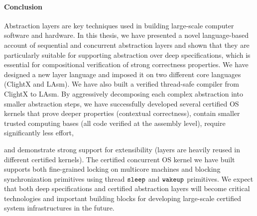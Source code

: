 
\paragraph{Conclusion}
Abstraction layers are key techniques used in building large-scale
computer software and hardware. In this thesis, we have presented a
novel language-based account of sequential and concurrent abstraction layers and shown that they
are particularly suitable for supporting abstraction over deep
specifications, which is essential for compositional verification of
strong correctness properties. We have designed a new layer language
and imposed it on two different core languages (ClightX and LAsm). We
have also built a verified thread-safe compiler from ClightX to LAsm. By
aggressively decomposing each complex abstraction into smaller
abstraction steps, we have successfully developed several certified OS
kernels that prove deeper properties (contextual correctness), contain
smaller trusted computing bases (all code verified at the assembly
level), require significantly less effort, 
and demonstrate
strong support for extensibility (layers are heavily reused in
different certified kernels).  The
certified concurrent OS kernel we have built supports both fine-grained locking
on multicore machines and blocking synchronization primitives using
thread ${\texttt{sleep}}$ and ${\texttt{wakeup}}$ primitives. 
We expect that both deep specifications
and certified abstraction layers will become critical technologies and
important building blocks for developing large-scale certified system
infrastructures in the future.